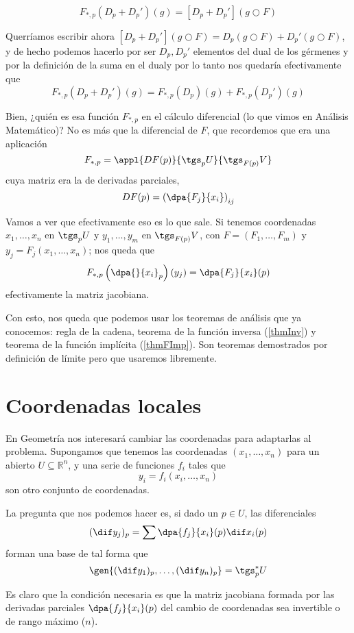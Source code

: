 \[ F_{*,p}(D_p + D_p')(g) = [D_p + D_p'](g○F) \]

Querríamos escribir ahora  $[D_p + D_p'](g○F) = D_p (g○F) + D_p'(g○F)$, y de hecho podemos hacerlo por ser $D_p, D_p'$ elementos del dual de los gérmenes y por la definición de la suma en el dual\footnotemark y por lo tanto nos quedaría efectivamente que \[ F_{*,p}(D_p + D_p')(g) = F_{*,p}(D_p)(g) + F_{*,p}(D_p')(g) \]


Bien, ¿quién es esa función $F_{*,p}$ en el cálculo diferencial (lo que vimos en Análisis Matemático)? No es más que la diferencial de $F$, que recordemos que era una aplicación \[ F_{*,p} = \appl{DF(p)}{\tgs_p U} {\tgs_{F(p)}V}\] cuya matriz era la de derivadas parciales, \[ DF(p) = \left(\dpa{F_j}{x_i}\right)_{ij} \]

Vamos a ver que efectivamente eso es lo que sale. Si tenemos coordenadas $x_1, \dotsc, x_n$ en $\tgs_pU$ y $y_1, \dotsc, y_m$ en $\tgs_{F(p)} V$, con $F = (F_1, \dotsc, F_m)$ y $y_j = F_j (x_1, \dotsc, x_n)$; nos queda que \[ F_{*, p} \left(\dpa{}{x_i}_p\right)(y_j) = \dpa{F_j}{x_i} (p) \] efectivamente la matriz jacobiana.

Con esto, nos queda que podemos usar los teoremas de análisis que ya conocemos: regla de la cadena, teorema de la función inversa (\ref{thmInv}) y teorema de la función implícita (\ref{thmFImp}). Son teoremas demostrados por definición de límite pero que usaremos libremente.

\section{Coordenadas locales}

En Geometría nos interesará cambiar las coordenadas para adaptarlas al problema. Supongamos que tenemos las coordenadas $(x_1, \dotsc, x_n)$ para un abierto $U⊆ℝ^n$, y una serie de funciones $f_i$ tales que \[ y_i = f_i(x_i, \dotsc, x_n)\] son otro conjunto de coordenadas.

La pregunta que nos podemos hacer es, si dado un $p ∈ U$, las diferenciales \[ (\dif y_j)_p = \sum \dpa{f_j}{x_i}(p) \dif x_i (p)\] forman una base de tal forma que \[ \gen{(\dif y_1)_p, \dotsc, (\dif y_n)_p} = \tgs_p^* U \]

Es claro que la condición necesaria es que la matriz jacobiana formada por las derivadas parciales $\dpa{f_j}{x_i}(p)$ del cambio de coordenadas sea invertible o de rango máximo ($n$).

